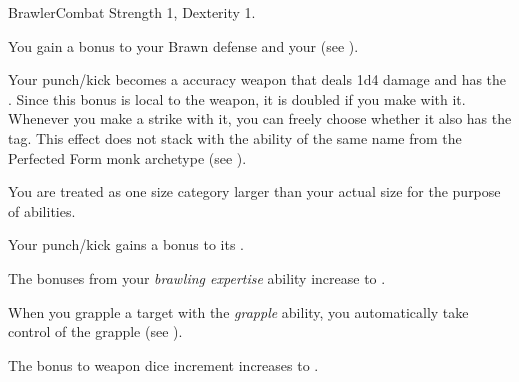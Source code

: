   \begin{feat}{Brawler}{Combat}
    \featpre Strength 1, Dexterity 1.

     You gain a  bonus to your Brawn defense and your  (see ).

     Your punch/kick  becomes a  accuracy weapon that deals 1d4 damage and has the  .
    Since this bonus is local to the weapon, it is doubled if you make  with it.
    Whenever you make a strike with it, you can freely choose whether it also has the \atSubdual tag.
    This effect does not stack with the ability of the same name from the Perfected Form monk archetype (see ).

     You are treated as one size category larger than your actual size for the purpose of \atSizeBased \atBrawling abilities.

     Your punch/kick  gains a  bonus to its .

     The bonuses from your \textit{brawling expertise} ability increase to .

     When you grapple a target with the \textit{grapple} ability, you automatically take control of the grapple (see ).

     The bonus to weapon dice increment increases to .
  \end{feat}

